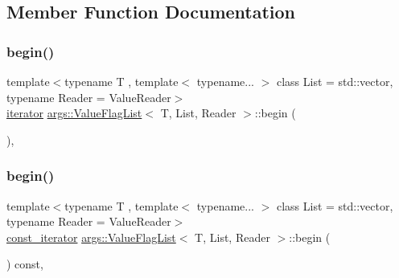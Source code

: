 \subsection{Member Function Documentation}
\mbox{\label{classargs_1_1_value_flag_list_a44d5f3380abe2ac5033c437042a69970}} 
\subsubsection{\texorpdfstring{begin()}{begin()}\hspace{0.1cm}{\footnotesize\ttfamily [1/2]}}
{\footnotesize\ttfamily template$<$typename T , template$<$ typename... $>$ class List = std\+::vector, typename Reader  = Value\+Reader$>$ \\
\hyperlink{classargs_1_1_value_flag_list_a4374b7a70c21c42d72912ec5ce323515}{iterator} \hyperlink{classargs_1_1_value_flag_list}{args\+::\+Value\+Flag\+List}$<$ T, List, Reader $>$\+::begin (\begin{DoxyParamCaption}{ }\end{DoxyParamCaption})\hspace{0.3cm}{\ttfamily [inline]}, {\ttfamily [noexcept]}}

\mbox{\label{classargs_1_1_value_flag_list_aaea6a38680e01450b11341439178cdb4}} 
\subsubsection{\texorpdfstring{begin()}{begin()}\hspace{0.1cm}{\footnotesize\ttfamily [2/2]}}
{\footnotesize\ttfamily template$<$typename T , template$<$ typename... $>$ class List = std\+::vector, typename Reader  = Value\+Reader$>$ \\
\hyperlink{classargs_1_1_value_flag_list_afc267bd3d85ff266eccf4b66cea4a274}{const\+\_\+iterator} \hyperlink{classargs_1_1_value_flag_list}{args\+::\+Value\+Flag\+List}$<$ T, List, Reader $>$\+::begin (\begin{DoxyParamCaption}{ }\end{DoxyParamCaption}) const\hspace{0.3cm}{\ttfamily [inline]}, {\ttfamily [noexcept]}}

